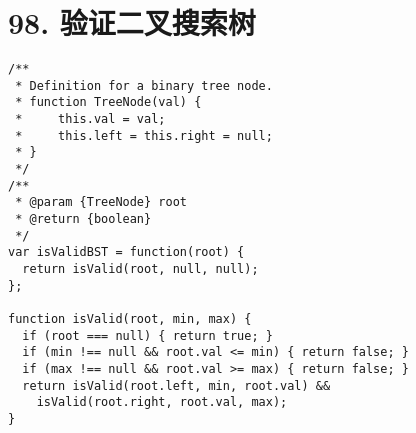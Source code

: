 \newpage
\section{98. 验证二叉搜索树}
\label{leetcode:98}

\begin{verbatim}
/**
 * Definition for a binary tree node.
 * function TreeNode(val) {
 *     this.val = val;
 *     this.left = this.right = null;
 * }
 */
/**
 * @param {TreeNode} root
 * @return {boolean}
 */
var isValidBST = function(root) {
  return isValid(root, null, null);
};

function isValid(root, min, max) {
  if (root === null) { return true; }
  if (min !== null && root.val <= min) { return false; }
  if (max !== null && root.val >= max) { return false; }
  return isValid(root.left, min, root.val) &&
    isValid(root.right, root.val, max);
}
\end{verbatim}